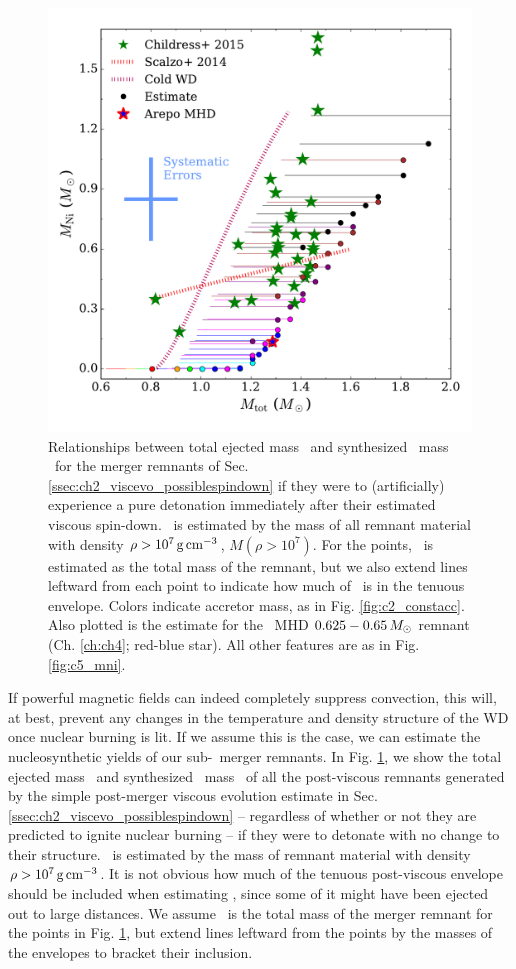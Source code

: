 \begin{figure}
\centering
\includegraphics[angle=0,width=0.8\columnwidth]{conclusion/figures/c_MNi.pdf}
\caption{Relationships between total ejected mass \Mtot\ and synthesized \Ni\ mass \MNi\ for the merger remnants of Sec. \ref{ssec:ch2_viscevo_possiblespindown} if they were to (artificially) experience a pure detonation immediately after their estimated viscous spin-down.  \MNi\ is estimated by the mass of all remnant material with density $\rho>10^7\,\gcc$, $M(\rho>10^7)$.  For the points, \Mtot\ is estimated as the total mass of the remnant, but we also extend lines leftward from each point to indicate how much of \Mtot\ is in the tenuous envelope.  Colors indicate accretor mass, as in Fig. \ref{fig:c2_constacc}.  Also plotted is the estimate for the \arepo\ MHD $0.625 - 0.65\,\Msun$ remnant (Ch. \ref{ch:ch4}; red-blue star).  All other features are as in Fig. \ref{fig:c5_mni}.}
\label{fig:c6_mcmce_mni}
\end{figure}

If powerful magnetic fields can indeed completely suppress convection, this will, at best, prevent any changes in the temperature and density structure of the WD once nuclear burning is lit.  If we assume this is the case, we can estimate the nucleosynthetic yields of our sub-\Mch\ merger remnants.  In Fig. \ref{fig:c6_mcmce_mni}, we show the total ejected mass \Mtot\ and synthesized \Ni\ mass \MNi\ of all the post-viscous remnants generated by the simple post-merger viscous evolution estimate in Sec. \ref{ssec:ch2_viscevo_possiblespindown} -- regardless of whether or not they are predicted to ignite nuclear burning -- if they were to detonate with no change to their structure.  \MNi\ is estimated by the mass of remnant material with density $\rho>10^7\,\gcc$.  It is not obvious how much of the tenuous post-viscous envelope should be included when estimating \Mtot, since some of it might have been ejected out to large distances.  We assume \Mtot\ is the total mass of the merger remnant for the points in Fig. \ref{fig:c6_mcmce_mni}, but extend lines leftward from the points by the masses of the envelopes to bracket their inclusion.

